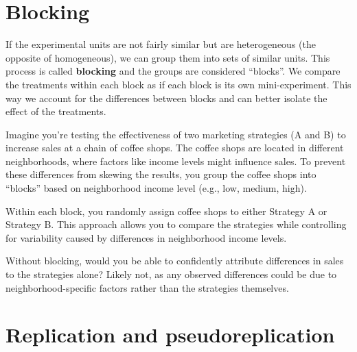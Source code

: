 \documentclass[
  letterpaper,
  DIV=11,
  numbers=noendperiod,
  oneside]{scrreprt}
\begin{document}
\section*{\texorpdfstring{\textbf{Blocking}}{Blocking}}\label{blocking}


If the experimental units are not fairly similar but are heterogeneous
(the opposite of homogeneous), we can group them into sets of similar
units. This process is called \textbf{blocking} and the groups are
considered ``blocks''. We compare the treatments within each block as if
each block is its own mini-experiment. This way we account for the
differences between blocks and can better isolate the effect of the
treatments.

\begin{tcolorbox}[enhanced jigsaw, toprule=.15mm, colbacktitle=quarto-callout-warning-color!10!white, toptitle=1mm, left=2mm, colframe=quarto-callout-warning-color-frame, bottomrule=.15mm, titlerule=0mm, breakable, opacitybacktitle=0.6, colback=white, coltitle=black, opacityback=0, bottomtitle=1mm, title={Example 2.2 EDIT THIS STILL}, rightrule=.15mm, arc=.35mm, leftrule=.75mm]

Imagine you're testing the effectiveness of two marketing strategies (A
and B) to increase sales at a chain of coffee shops. The coffee shops
are located in different neighborhoods, where factors like income levels
might influence sales. To prevent these differences from skewing the
results, you group the coffee shops into ``blocks'' based on
neighborhood income level (e.g., low, medium, high).

Within each block, you randomly assign coffee shops to either Strategy A
or Strategy B. This approach allows you to compare the strategies while
controlling for variability caused by differences in neighborhood income
levels.

Without blocking, would you be able to confidently attribute differences
in sales to the strategies alone? Likely not, as any observed
differences could be due to neighborhood-specific factors rather than
the strategies themselves.

\end{tcolorbox}

\section*{\texorpdfstring{\textbf{Replication and
pseudoreplication}}{Replication and pseudoreplication}}\label{replication-and-pseudoreplication}
\end{document}
